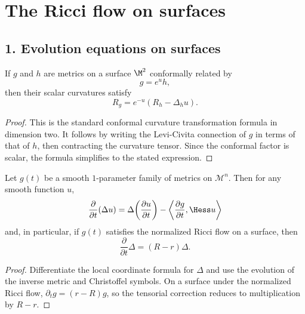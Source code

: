 \chapter{The Ricci flow on surfaces}

\section*{1. Evolution equations on surfaces}

\begin{theorem}
\label{ch05-thm-conformal-scalar-curvature}
If \(g\) and \(h\) are metrics on a surface \(\M^2\) conformally related by
\[
g=e^{u}h,
\]
then their scalar curvatures satisfy
\[
R_g=e^{-u}\left(R_h-\Delta_h u\right).
\]
\end{theorem}

\begin{proof}
\sketch This is the standard conformal curvature transformation formula in dimension two.
It follows by writing the Levi-Civita connection of \(g\) in terms of that of \(h\), then contracting the curvature tensor. Since the conformal factor is scalar, the formula simplifies to the stated expression.
\end{proof}

\begin{lemma}
\label{ch05-lem-laplacian-evolution}
Let \(g(t)\) be a smooth \(1\)-parameter family of metrics on \(\mathcal M^n\). Then for any smooth function \(u\),
\[
\frac{\partial}{\partial t}(\Delta u)
=\Delta\!\left(\frac{\partial u}{\partial t}\right)
-\left\langle \frac{\partial g}{\partial t},\Hess u\right\rangle
\]
and, in particular, if \(g(t)\) satisfies the normalized Ricci flow on a surface, then
\[
\frac{\partial}{\partial t}\Delta=(R-r)\Delta.
\]
\end{lemma}

\begin{proof}
\sketch Differentiate the local coordinate formula for \(\Delta\) and use the evolution of the inverse metric and Christoffel symbols. On a surface under the normalized Ricci flow, \(\partial_t g=(r-R)g\), so the tensorial correction reduces to multiplication by \(R-r\).
\end{proof}

